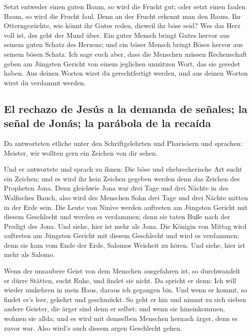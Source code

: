  Setzt entweder einen guten Baum, so wird die Frucht gut;
oder setzt einen faulen Baum, so wird die Frucht faul. Denn an der
Frucht erkennt man den Baum.  Ihr Otterngezüchte, wie
könnt ihr Gutes reden, dieweil ihr böse seid? Wes das Herz voll ist, des
geht der Mund über.  Ein guter Mensch bringt Gutes hervor
aus seinem guten Schatz des Herzens; und ein böser Mensch bringt Böses
hervor aus seinem bösen Schatz.  Ich sage euch aber, dass
die Menschen müssen Rechenschaft geben am Jüngsten Gericht von einem
jeglichen unnützen Wort, das sie geredet haben.  Aus
deinen Worten wirst du gerechtfertigt werden, und aus deinen Worten
wirst du verdammt werden.

\hypertarget{el-rechazo-de-jesuxfas-a-la-demanda-de-seuxf1ales-la-seuxf1al-de-jonuxe1s-la-paruxe1bola-de-la-recauxedda}{%
\subsection{El rechazo de Jesús a la demanda de señales; la señal de
Jonás; la parábola de la
recaída}\label{el-rechazo-de-jesuxfas-a-la-demanda-de-seuxf1ales-la-seuxf1al-de-jonuxe1s-la-paruxe1bola-de-la-recauxedda}}

 Da antworteten etliche unter den Schriftgelehrten und
Pharisäern und sprachen: Meister, wir wollten gern ein Zeichen von dir
sehen.

 Und er antwortete und sprach zu ihnen: Die böse und
ehebrecherische Art sucht ein Zeichen; und es wird ihr kein Zeichen
gegeben werden denn das Zeichen des Propheten Jona.  Denn
gleichwie Jona war drei Tage und drei Nächte in des Walfisches Bauch,
also wird des Menschen Sohn drei Tage und drei Nächte mitten in der Erde
sein.  Die Leute von Ninive werden auftreten am Jüngsten
Gericht mit diesem Geschlecht und werden es verdammen; denn sie taten
Buße nach der Predigt des Jona. Und siehe, hier ist mehr als Jona.
 Die Königin von Mittag wird auftreten am Jüngsten
Gericht mit diesem Geschlecht und wird es verdammen; denn sie kam vom
Ende der Erde, Salomos Weisheit zu hören. Und siehe, hier ist mehr als
Salomo.

 Wenn der unsaubere Geist von dem Menschen ausgefahren
ist, so durchwandelt er dürre Stätten, sucht Ruhe, und findet sie nicht.
 Da spricht er denn: Ich will wieder umkehren in mein
Haus, daraus ich gegangen bin. Und wenn er kommt, so findet er's leer,
gekehrt und geschmückt.  So geht er hin und nimmt zu sich
sieben andere Geister, die ärger sind denn er selbst; und wenn sie
hineinkommen, wohnen sie allda; und es wird mit demselben Menschen
hernach ärger, denn es zuvor war. Also wird's auch diesem argen
Geschlecht gehen.

